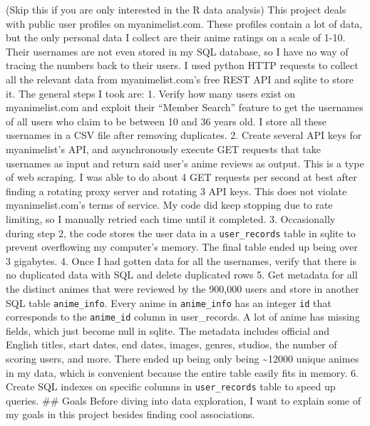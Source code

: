 \documentclass[
]{article}
\begin{document}
(Skip this if you are only interested in the R data analysis) This
project deals with public user profiles on myanimelist.com. These
profiles contain a lot of data, but the only personal data I collect are
their anime ratings on a scale of 1-10. Their usernames are not even
stored in my SQL database, so I have no way of tracing the numbers back
to their users. I used python HTTP requests to collect all the relevant
data from myanimelist.com's free REST API and sqlite to store it. The
general steps I took are: 1. Verify how many users exist on
myanimelist.com and exploit their ``Member Search'' feature to get the
usernames of all users who claim to be between 10 and 36 years old. I
store all these usernames in a CSV file after removing duplicates. 2.
Create several API keys for myanimelist's API, and asynchronously
execute GET requests that take usernames as input and return said user's
anime reviews as output. This is a type of web scraping. I was able to
do about 4 GET requests per second at best after finding a rotating
proxy server and rotating 3 API keys. This does not violate
myanimelist.com's terms of service. My code did keep stopping due to
rate limiting, so I manually retried each time until it completed. 3.
Occasionally during step 2, the code stores the user data in a
\texttt{user\_records} table in sqlite to prevent overflowing my
computer's memory. The final table ended up being over 3 gigabytes. 4.
Once I had gotten data for all the usernames, verify that there is no
duplicated data with SQL and delete duplicated rows 5. Get metadata for
all the distinct animes that were reviewed by the 900,000 users and
store in another SQL table \texttt{anime\_info}. Every anime in
\texttt{anime\_info} has an integer \texttt{id} that corresponds to the
\texttt{anime\_id} column in user\_records. A lot of anime has missing
fields, which just become null in sqlite. The metadata includes official
and English titles, start dates, end dates, images, genres, studios, the
number of scoring users, and more. There ended up being only being
\textasciitilde12000 unique animes in my data, which is convenient
because the entire table easily fits in memory. 6. Create SQL indexes on
specific columns in \texttt{user\_records} table to speed up queries.
\#\# Goals Before diving into data exploration, I want to explain some
of my goals in this project besides finding cool associations.
\end{document}
